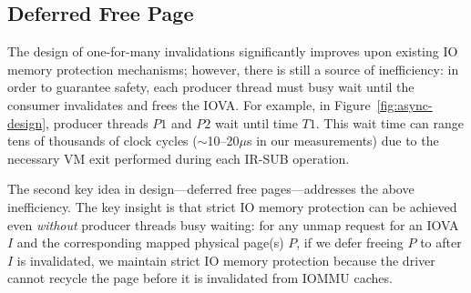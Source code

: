         
    
    


    

\subsection{Deferred Free Page}
\label{ssec:dfp}
The {\name} design of one-for-many invalidations significantly improves upon existing IO memory protection mechanisms; 
    however, there is still a source of inefficiency: in order to guarantee safety, 
    each producer thread must busy wait until the consumer invalidates and frees the IOVA. For example, in Figure~\ref{fig:async-design}, producer threads $P1$ and $P2$ wait until time $T1$. 
This wait time can range tens of thousands of clock cycles 
({${\sim}$10--20$\mu$s} in our measurements) 
due to the necessary VM exit performed during each IR-SUB operation. 


The second key idea in {\name} design---deferred free pages---addresses the above inefficiency. 
The {key insight} is that strict IO memory protection can be achieved even \emph{without} producer threads busy waiting: 
for any unmap request for an IOVA $I$ and the corresponding mapped physical page(s) $P$, 
    if we defer freeing $P$ to after $I$ is invalidated, 
    we maintain strict IO memory protection
    because the driver cannot recycle the page before it is invalidated from IOMMU caches. %

